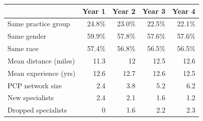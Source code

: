 
\begin{tabular}{lrrrr}
\toprule
  & Year 1 & Year 2 & Year 3 & Year 4\\
\midrule
Same practice group & 24.8\% & 23.0\% & 22.5\% & 22.1\%\\
Same gender & 59.9\% & 57.8\% & 57.6\% & 57.6\%\\
Same race & 57.4\% & 56.8\% & 56.5\% & 56.5\%\\
Mean distance (miles) & 11.3 & 12 & 12.5 & 12.6\\
Mean experience (yrs) & 12.6 & 12.7 & 12.6 & 12.5\\
PCP network size & 2.4 & 3.8 & 5.2 & 6.2\\
New specialists & 2.4 & 2.1 & 1.6 & 1.2\\
Dropped specialists & 0 & 1.6 & 2.2 & 2.3\\
\bottomrule
\end{tabular}
